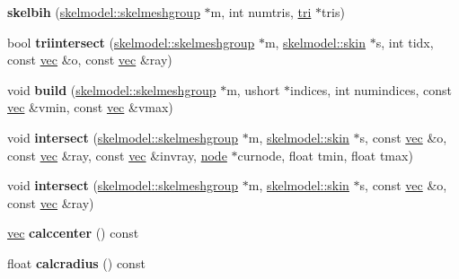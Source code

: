\begin{DoxyCompactItemize}
\item 
\mbox{\label{structskelbih_a9e567478b3c57c9055038d817ac4662f}} 
{\bfseries skelbih} (\hyperlink{structskelmodel_1_1skelmeshgroup}{skelmodel\+::skelmeshgroup} $\ast$m, int numtris, \hyperlink{structskelbih_1_1tri}{tri} $\ast$tris)
\item 
\mbox{\label{structskelbih_ac0781e0c7ebeb217972006c87ad19039}} 
bool {\bfseries triintersect} (\hyperlink{structskelmodel_1_1skelmeshgroup}{skelmodel\+::skelmeshgroup} $\ast$m, \hyperlink{structanimmodel_1_1skin}{skelmodel\+::skin} $\ast$s, int tidx, const \hyperlink{structvec}{vec} \&o, const \hyperlink{structvec}{vec} \&ray)
\item 
\mbox{\label{structskelbih_a45f190687cdabb30a0ac46fef4f077a9}} 
void {\bfseries build} (\hyperlink{structskelmodel_1_1skelmeshgroup}{skelmodel\+::skelmeshgroup} $\ast$m, ushort $\ast$indices, int numindices, const \hyperlink{structvec}{vec} \&vmin, const \hyperlink{structvec}{vec} \&vmax)
\item 
\mbox{\label{structskelbih_a385dd49d0c1d3648b9d0d351621be2b0}} 
void {\bfseries intersect} (\hyperlink{structskelmodel_1_1skelmeshgroup}{skelmodel\+::skelmeshgroup} $\ast$m, \hyperlink{structanimmodel_1_1skin}{skelmodel\+::skin} $\ast$s, const \hyperlink{structvec}{vec} \&o, const \hyperlink{structvec}{vec} \&ray, const \hyperlink{structvec}{vec} \&invray, \hyperlink{structskelbih_1_1node}{node} $\ast$curnode, float tmin, float tmax)
\item 
\mbox{\label{structskelbih_a34889a04b093c958d86b8f568d9e3417}} 
void {\bfseries intersect} (\hyperlink{structskelmodel_1_1skelmeshgroup}{skelmodel\+::skelmeshgroup} $\ast$m, \hyperlink{structanimmodel_1_1skin}{skelmodel\+::skin} $\ast$s, const \hyperlink{structvec}{vec} \&o, const \hyperlink{structvec}{vec} \&ray)
\item 
\mbox{\label{structskelbih_ae127497f76dec42e00ede901605206c4}} 
\hyperlink{structvec}{vec} {\bfseries calccenter} () const
\item 
\mbox{\label{structskelbih_a6b34fc8a4a7bd026d926c044cb6c3eb6}} 
float {\bfseries calcradius} () const
\end{DoxyCompactItemize}

